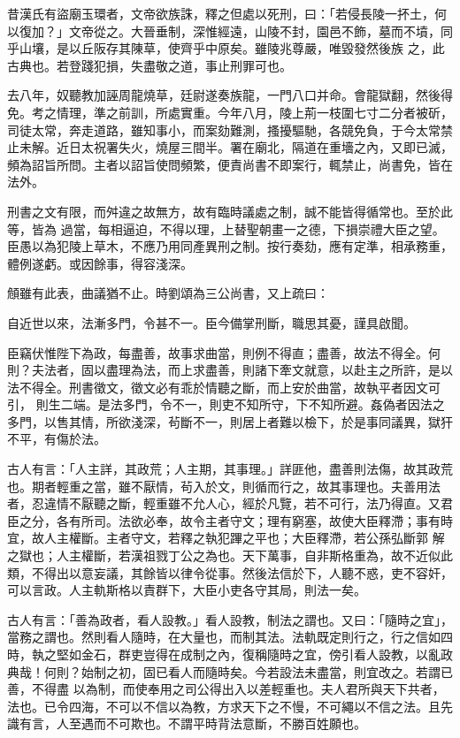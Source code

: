 \begin{pinyinscope}
 昔漢氏有盜廟玉環者，文帝欲族誅，釋之但處以死刑，曰：「若侵長陵一抔土，何以復加？」文帝從之。大晉垂制，深惟經遠，山陵不封，園邑不飾，墓而不墳，同乎山壤，是以丘阪存其陳草，使齊乎中原矣。雖陵兆尊嚴，唯毀發然後族
 之，此古典也。若登踐犯損，失盡敬之道，事止刑罪可也。



 去八年，奴聽教加誣周龍燒草，廷尉遂奏族龍，一門八口并命。會龍獄翻，然後得免。考之情理，準之前訓，所處實重。今年八月，陵上荊一枝圍七寸二分者被斫，司徒太常，奔走道路，雖知事小，而案劾難測，搔擾驅馳，各競免負，于今太常禁止未解。近日太祝署失火，燒屋三間半。署在廟北，隔道在重墻之內，又即已滅，頻為詔旨所問。主者以詔旨使問頻繁，便責尚書不即案行，輒禁止，尚書免，皆在法外。



 刑書之文有限，而舛違之故無方，故有臨時議處之制，誠不能皆得循常也。至於此等，皆為
 過當，每相逼迫，不得以理，上替聖朝畫一之德，下損崇禮大臣之望。臣愚以為犯陵上草木，不應乃用同產異刑之制。按行奏劾，應有定準，相承務重，體例遂虧。或因餘事，得容淺深。



 頠雖有此表，曲議猶不止。時劉頌為三公尚書，又上疏曰：



 自近世以來，法漸多門，令甚不一。臣今備掌刑斷，職思其憂，謹具啟聞。



 臣竊伏惟陛下為政，每盡善，故事求曲當，則例不得直；盡善，故法不得全。何則？夫法者，固以盡理為法，而上求盡善，則諸下牽文就意，以赴主之所許，是以法不得全。刑書徵文，徵文必有乖於情聽之斷，而上安於曲當，故執平者因文可引，
 則生二端。是法多門，令不一，則吏不知所守，下不知所避。姦偽者因法之多門，以售其情，所欲淺深，茍斷不一，則居上者難以檢下，於是事同議異，獄犴不平，有傷於法。



 古人有言：「人主詳，其政荒；人主期，其事理。」詳匪他，盡善則法傷，故其政荒也。期者輕重之當，雖不厭情，茍入於文，則循而行之，故其事理也。夫善用法者，忍違情不厭聽之斷，輕重雖不允人心，經於凡覽，若不可行，法乃得直。又君臣之分，各有所司。法欲必奉，故令主者守文；理有窮塞，故使大臣釋滯；事有時宜，故人主權斷。主者守文，若釋之執犯蹕之平也；大臣釋滯，若公孫弘斷郭
 解之獄也；人主權斷，若漢祖戮丁公之為也。天下萬事，自非斯格重為，故不近似此類，不得出以意妄議，其餘皆以律令從事。然後法信於下，人聽不惑，吏不容奸，可以言政。人主軌斯格以責群下，大臣小吏各守其局，則法一矣。



 古人有言：「善為政者，看人設教。」看人設教，制法之謂也。又曰：「隨時之宜」，當務之謂也。然則看人隨時，在大量也，而制其法。法軌既定則行之，行之信如四時，執之堅如金石，群吏豈得在成制之內，復稱隨時之宜，傍引看人設教，以亂政典哉！何則？始制之初，固已看人而隨時矣。今若設法未盡當，則宜改之。若謂已善，不得盡
 以為制，而使奉用之司公得出入以差輕重也。夫人君所與天下共者，法也。已令四海，不可以不信以為教，方求天下之不慢，不可繩以不信之法。且先識有言，人至遇而不可欺也。不謂平時背法意斷，不勝百姓願也。




\end{pinyinscope}
